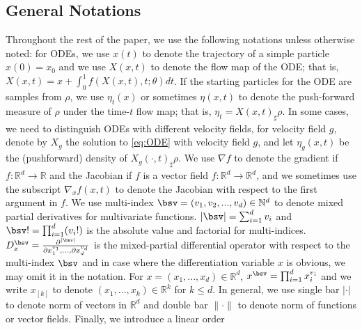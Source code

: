 \subsection{General Notations}
Throughout the rest of the paper, we use the following notations
unless otherwise noted: for ODEs, we use $x(t)$ to denote the
trajectory of a simple particle $x(0) = x_0$ and we use $X(x,t)$ to
denote the flow map of the ODE; that is,
$X(x,t) = x + \int_0^1f(X(x,t),t;\theta)dt$. If the starting particles 
for the ODE are samples from $\rho$, we use $\eta_t(x)$ or
sometimes $\eta(x,t)$ to denote the push-forward measure of $\rho$ under
the time-$t$ flow map; that is, $\eta_t = X(x,t)_\sharp\rho$. In some cases, we need to distinguish ODEs with different velocity fields, for velocity field $g$, denote by
  $X_g$ the solution to \eqref{eq:ODE} with
  velocity field $g$,
  and let $\eta_g(x,t)$ be the (pushforward) density of
  $X_g(\cdot,t)_\sharp\rho$. We use
$\nabla f$ to denote the gradient if
$f:\mathbb{R}^d\rightarrow\mathbb{R}$ and the Jacobian if $f$ is a
vector field $f:\mathbb{R}^d\rightarrow\mathbb{R}^d$, and we sometimes
use the subscript $\nabla_xf(x,t)$ to denote the Jacobian with respect
to the first argument in $f$. We use multi-index
$\bsv = (v_1,v_2,...,v_d) \in \mathbb{N}^d$ to denote mixed partial
derivatives for multivariate functions. $|\bsv| = \sum_{i = 1}^d v_i$ and
$\bsv! = \prod_{i=1}^d(v_i!)$ is the absolute value and factorial for
multi-indices.
$D^\bsv_x = \frac{\partial^{|\bsv|}}{\partial x_1^{v_1}, ..., \partial
  x_d^{v_d}}$ is the mixed-partial differential operator with respect
to the multi-index $\bsv$ and in case where the differentiation variable $x$ is obvious, we may omit it in the notation. For
$x = (x_1,..., x_d) \in \mathbb{R}^d$, $x^\bsv = \prod_{i=1}^d x_i^{v_i}$
and we write $x_{[k]}$ to denote $(x_1,...,x_k)\in\mathbb{R}^k$ for $k\leq d$. In general, we use single bar $|\cdot|$ to
denote norm of vectors in $\mathbb{R}^d$ and double bar $\|\cdot\|$ to
denote norm of functions or vector fields.  Finally, we introduce a linear order
